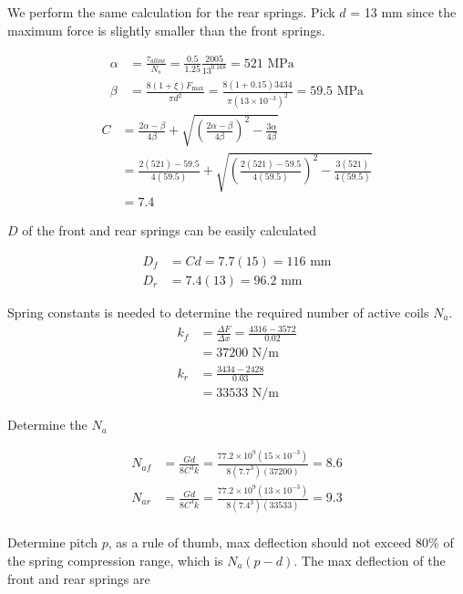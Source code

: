 \documentclass[
10pt,
a4paper,
openany,
svgnames,
]{book}
\begin{document}
\begin{solution}
  We perform the same calculation for the rear springs. Pick $d$ = 13 mm since the maximum force is slightly smaller than the front springs.

   \begin{align*}
     \alpha &= \frac{\tau_{allow}}{N_s} = \frac{0.5}{1.25}\frac{2005}{13^{0.168}} = 521 \text{ MPa} \\ 
    \beta &= \frac{8(1 + \xi)F_{\max}}{\pi d^2} = \frac{8(1 + 0.15)3434}{\pi (13 \times 10^{-3})^2} = 59.5 \text{ MPa}
  \end{align*}
  \begin{align*}
    C &= \frac{2\alpha  - \beta}{4\beta} + \sqrt {\left( \frac{2\alpha  - \beta}{4\beta} \right)^2 - \frac{3\alpha}{4\beta}}  \\ 
      & = \frac{2(521) - 59.5}{4(59.5)} + \sqrt {\left( \frac{2(521) - 59.5}{4(59.5)} \right)^2 - \frac{3(521)}{4(59.5)}}  \\ 
      &= 7.4 
  \end{align*}

  $D$ of the front and rear springs can be easily calculated

  \begin{align*}
    D_f &= Cd = 7.7(15) = 116 \text{ mm} \\
    D_r &= 7.4(13) = 96.2 \text{ mm}
  \end{align*}

  Spring constants is needed to determine the required number of active coils $N_a$.
  \begin{align*}
    k_f &= \frac{\Delta F}{\Delta x} = \frac{4316 - 3572}{0.02} \\
        &= 37200 \text{ N/m} \\
    k_r &= \frac{3434 - 2428}{0.03} \\
        &= 33533 \text{ N/m}
  \end{align*}

  Determine the $N_a$

  \begin{align*}
    N_{af} &= \frac{Gd}{8C^3k} = \frac{77.2 \times 10^9(15 \times 10^{-3})}{8(7.7^3)(37200)} = 8.6 \\
    N_{ar} &= \frac{Gd}{8C^3k} = \frac{77.2 \times 10^9(13 \times 10^{-3})}{8(7.4^3)(33533)} = 9.3 \\
  \end{align*}

Determine pitch $p$, as a rule of thumb, max deflection should not exceed 80\% of the spring compression range, which is $N_a(p - d)$. The max deflection of the front and rear springs are


\end{solution}
\end{document}
